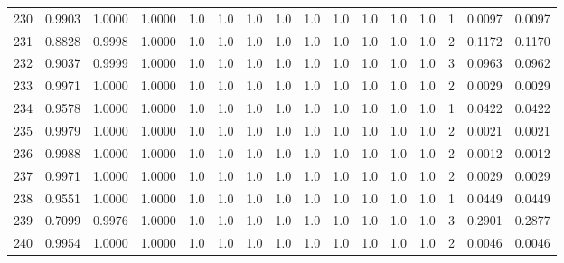 \begin{tabular}{lrrrrrrrrrrrrrrr}
230 &      0.9903 &  1.0000 &  1.0000 &     1.0 &     1.0 &     1.0 &     1.0 &     1.0 &     1.0 &     1.0 &      1.0 &        1.0 &      1 &                    0.0097 &                     0.0097 \\
231 &      0.8828 &  0.9998 &  1.0000 &     1.0 &     1.0 &     1.0 &     1.0 &     1.0 &     1.0 &     1.0 &      1.0 &        1.0 &      2 &                    0.1172 &                     0.1170 \\
232 &      0.9037 &  0.9999 &  1.0000 &     1.0 &     1.0 &     1.0 &     1.0 &     1.0 &     1.0 &     1.0 &      1.0 &        1.0 &      3 &                    0.0963 &                     0.0962 \\
233 &      0.9971 &  1.0000 &  1.0000 &     1.0 &     1.0 &     1.0 &     1.0 &     1.0 &     1.0 &     1.0 &      1.0 &        1.0 &      2 &                    0.0029 &                     0.0029 \\
234 &      0.9578 &  1.0000 &  1.0000 &     1.0 &     1.0 &     1.0 &     1.0 &     1.0 &     1.0 &     1.0 &      1.0 &        1.0 &      1 &                    0.0422 &                     0.0422 \\
235 &      0.9979 &  1.0000 &  1.0000 &     1.0 &     1.0 &     1.0 &     1.0 &     1.0 &     1.0 &     1.0 &      1.0 &        1.0 &      2 &                    0.0021 &                     0.0021 \\
236 &      0.9988 &  1.0000 &  1.0000 &     1.0 &     1.0 &     1.0 &     1.0 &     1.0 &     1.0 &     1.0 &      1.0 &        1.0 &      2 &                    0.0012 &                     0.0012 \\
237 &      0.9971 &  1.0000 &  1.0000 &     1.0 &     1.0 &     1.0 &     1.0 &     1.0 &     1.0 &     1.0 &      1.0 &        1.0 &      2 &                    0.0029 &                     0.0029 \\
238 &      0.9551 &  1.0000 &  1.0000 &     1.0 &     1.0 &     1.0 &     1.0 &     1.0 &     1.0 &     1.0 &      1.0 &        1.0 &      1 &                    0.0449 &                     0.0449 \\
239 &      0.7099 &  0.9976 &  1.0000 &     1.0 &     1.0 &     1.0 &     1.0 &     1.0 &     1.0 &     1.0 &      1.0 &        1.0 &      3 &                    0.2901 &                     0.2877 \\
240 &      0.9954 &  1.0000 &  1.0000 &     1.0 &     1.0 &     1.0 &     1.0 &     1.0 &     1.0 &     1.0 &      1.0 &        1.0 &      2 &                    0.0046 &                     0.0046 \\

\end{tabular}
